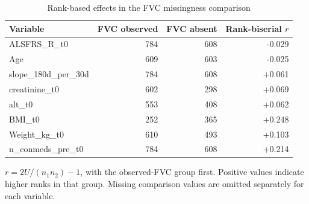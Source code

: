 \begin{table}[ht!]
\centering
\small
\caption[Rank-based effects in the FVC missingness comparison]{Rank-based effects in the FVC missingness comparison}
\label{tab:review_s1_rank_effects}
\setlength{\tabcolsep}{4pt}
\begin{tabular}{lrrr}
\toprule
Variable & FVC observed & FVC absent & Rank-biserial $r$ \\
\midrule
ALSFRS\_R\_t0 & 784 & 608 & -0.029 \\
Age & 609 & 603 & -0.025 \\
slope\_180d\_per\_30d & 784 & 608 & +0.061 \\
creatinine\_t0 & 602 & 298 & +0.069 \\
alt\_t0 & 553 & 408 & +0.062 \\
BMI\_t0 & 252 & 365 & +0.248 \\
Weight\_kg\_t0 & 610 & 493 & +0.103 \\
n\_conmeds\_pre\_t0 & 784 & 608 & +0.214 \\
\bottomrule
\end{tabular}
\par\smallskip
\begin{minipage}{0.98\linewidth}\footnotesize
$r=2U/(n_1n_2)-1$, with the observed-FVC group first. Positive values indicate higher ranks in that group. Missing comparison values are omitted separately for each variable.
\end{minipage}
\end{table}
